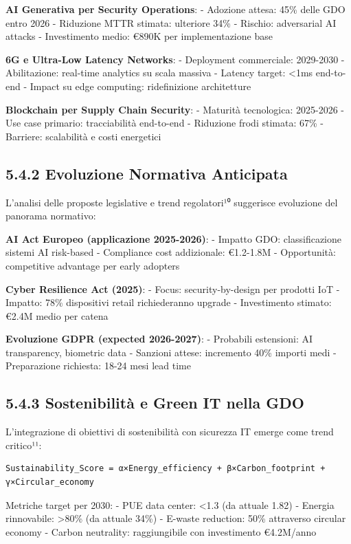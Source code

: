 \documentclass[12pt,a4paper,oneside]{book}
\numberwithin{figure}{chapter} %
\numberwithin{table}{chapter}  %
\begin{document}
\textbf{AI Generativa per Security Operations}: - Adozione attesa: 45\%
delle GDO entro 2026 - Riduzione MTTR stimata: ulteriore 34\% - Rischio:
adversarial AI attacks - Investimento medio: €890K per implementazione
base

\textbf{6G e Ultra-Low Latency Networks}: - Deployment commerciale:
2029-2030 - Abilitazione: real-time analytics su scala massiva - Latency
target: \textless1ms end-to-end - Impact su edge computing:
ridefinizione architetture

\textbf{Blockchain per Supply Chain Security}: - Maturità tecnologica:
2025-2026 - Use case primario: tracciabilità end-to-end - Riduzione
frodi stimata: 67\% - Barriere: scalabilità e costi energetici

\subsection{5.4.2 Evoluzione Normativa
Anticipata}\label{evoluzione-normativa-anticipata}

L'analisi delle proposte legislative e trend regolatori¹⁰ suggerisce
evoluzione del panorama normativo:

\textbf{AI Act Europeo (applicazione 2025-2026)}: - Impatto GDO:
classificazione sistemi AI risk-based - Compliance cost addizionale:
€1.2-1.8M - Opportunità: competitive advantage per early adopters

\textbf{Cyber Resilience Act (2025)}: - Focus: security-by-design per
prodotti IoT - Impatto: 78\% dispositivi retail richiederanno upgrade -
Investimento stimato: €2.4M medio per catena

\textbf{Evoluzione GDPR (expected 2026-2027)}: - Probabili estensioni:
AI transparency, biometric data - Sanzioni attese: incremento 40\%
importi medi - Preparazione richiesta: 18-24 mesi lead time

\subsection{5.4.3 Sostenibilità e Green IT nella
GDO}\label{sostenibilituxe0-e-green-it-nella-gdo}

L'integrazione di obiettivi di sostenibilità con sicurezza IT emerge
come trend critico¹¹:

\begin{verbatim}
Sustainability_Score = α×Energy_efficiency + β×Carbon_footprint + γ×Circular_economy
\end{verbatim}

Metriche target per 2030: - PUE data center: \textless1.3 (da attuale
1.82) - Energia rinnovabile: \textgreater80\% (da attuale 34\%) -
E-waste reduction: 50\% attraverso circular economy - Carbon neutrality:
raggiungibile con investimento €4.2M/anno
\end{document}
